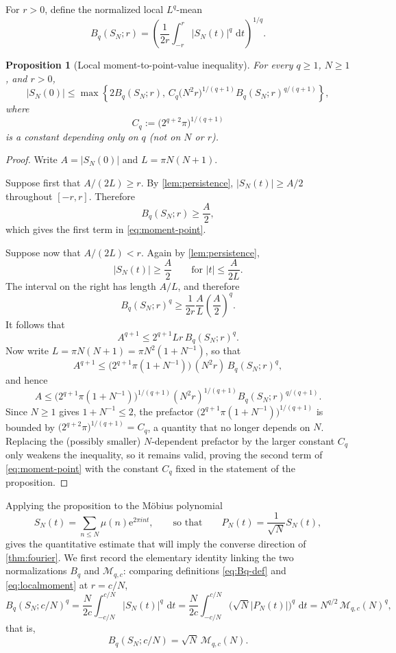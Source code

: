 \documentclass[11pt]{article}
\newtheorem{proposition}[theorem]{Proposition}
\theoremstyle{remark}
\newcommand{\e}{\mathrm e}
\newcommand{\dd}{\,\mathrm d}
\newcommand{\Mcal}{\mathcal M}
\begin{document}
For \(r>0\), define the normalized local \(L^q\)-mean
\begin{equation}\label{eq:Bq-def}
 B_q(S_N;r)
 =
 \left(
 \frac1{2r}\int_{-r}^{r}|S_N(t)|^q\,\dd t
 \right)^{1/q}.
\end{equation}

\begin{proposition}[Local moment-to-point-value inequality]
\label{prop:moment-point}
For every \(q\geq1\), \(N\geq1\), and \(r>0\),
\begin{equation}\label{eq:moment-point}
 |S_N(0)|
 \leq
 \max\left\{
 2B_q(S_N;r),
 \,
 C_q\bigl(N^2r\bigr)^{1/(q+1)}
 B_q(S_N;r)^{q/(q+1)}
 \right\},
\end{equation}
where
\[
 C_q:=\bigl(2^{q+2}\pi\bigr)^{1/(q+1)}
\]
is a constant depending only on \(q\) (not on \(N\) or \(r\)).
\end{proposition}

\begin{proof}
Write \(A=|S_N(0)|\) and \(L=\pi N(N+1)\).

Suppose first that \(A/(2L)\geq r\).  By
\cref{lem:persistence}, \(|S_N(t)|\geq A/2\) throughout
\([-r,r]\).  Therefore
\[
 B_q(S_N;r)\geq\frac A2,
\]
which gives the first term in \eqref{eq:moment-point}.

Suppose now that \(A/(2L)<r\).  Again by
\cref{lem:persistence},
\[
 |S_N(t)|\geq\frac A2
 \qquad\text{for }|t|\leq\frac{A}{2L}.
\]
The interval on the right has length \(A/L\), and therefore
\[
 B_q(S_N;r)^q
 \geq
 \frac1{2r}\frac{A}{L}\left(\frac A2\right)^q.
\]
It follows that
\[
 A^{q+1}
 \leq 2^{q+1}Lr\,B_q(S_N;r)^q.
\]
Now write \(L=\pi N(N+1)=\pi N^2(1+N^{-1})\), so that
\[
 A^{q+1}
 \leq
 \bigl(2^{q+1}\pi(1+N^{-1})\bigr)\,(N^2r)\,B_q(S_N;r)^q,
\]
and hence
\[
 A
 \leq
 \bigl(2^{q+1}\pi(1+N^{-1})\bigr)^{1/(q+1)}
 (N^2r)^{1/(q+1)}
 B_q(S_N;r)^{q/(q+1)}.
\]
Since \(N\geq1\) gives \(1+N^{-1}\leq2\), the prefactor
\(\bigl(2^{q+1}\pi(1+N^{-1})\bigr)^{1/(q+1)}\) is bounded by
\(\bigl(2^{q+2}\pi\bigr)^{1/(q+1)}=C_q\), a quantity that no longer
depends on \(N\).  Replacing the (possibly smaller) \(N\)-dependent
prefactor by the larger constant \(C_q\) only weakens the inequality,
so it remains valid, proving the second term of
\eqref{eq:moment-point} with the constant \(C_q\) fixed in the
statement of the proposition.
\end{proof}

Applying the proposition to the Möbius polynomial
\[
 S_N(t)=\sum_{n\leq N}\mu(n)\e^{2\pi i nt},
 \qquad\text{so that}\qquad
 P_N(t)=\frac1{\sqrt N}S_N(t),
\]
gives the quantitative estimate that will imply the converse direction
of \cref{thm:fourier}.  We first record the elementary identity linking
the two normalizations \(B_q\) and \(\Mcal_{q,c}\): comparing
definitions \eqref{eq:Bq-def} and \eqref{eq:localmoment} at \(r=c/N\),
\[
 B_q(S_N;c/N)^q
 =
 \frac{N}{2c}\int_{-c/N}^{c/N}|S_N(t)|^q\,\dd t
 =
 \frac{N}{2c}\int_{-c/N}^{c/N}\bigl(\sqrt N|P_N(t)|\bigr)^q\,\dd t
 =
 N^{q/2}\,\Mcal_{q,c}(N)^q,
\]
that is,
\begin{equation}\label{eq:BqMq}
 B_q(S_N;c/N)=\sqrt N\,\Mcal_{q,c}(N).
\end{equation}
\end{document}
